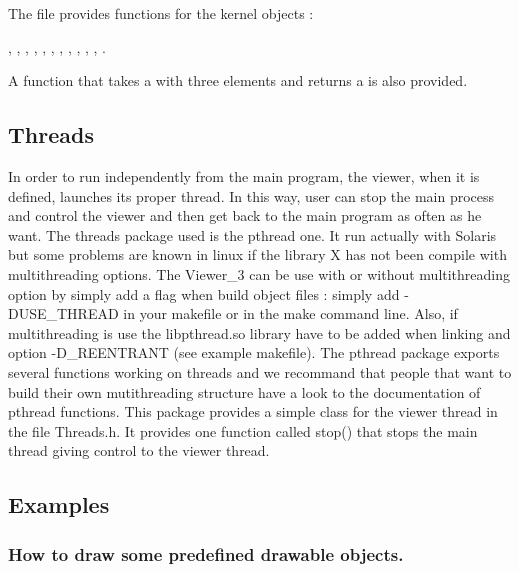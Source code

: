 The file  provides  functions
for the kernel objects : 

,  , ,
, , ,
, , , ,
, .

A function that takes a  with three elements and
returns a  is also provided.

\subsection{Threads}

In order to run independently from the main program, the viewer, when
it is defined, launches its proper thread. In this way, user can stop
the main process and control the viewer and then get back to the main
program as often as he want. 
The threads package used is the pthread one. It run actually with
Solaris but some problems are known in linux if the library X has not 
been compile with multithreading options. The Viewer\_3 can be use with 
or without multithreading option by simply add a flag when build
object files : simply add -DUSE\_THREAD in your makefile or in the make 
command line. Also, if multithreading is use the libpthread.so library
have to be added when linking and option -D\_REENTRANT (see example
makefile).
The pthread package exports several functions working on threads and
we recommand that people that want to build their own mutithreading
structure have a look to the documentation of pthread functions. This
package provides a simple class for the viewer thread in the file
Threads.h. It provides one function called stop() that stops the main
thread giving control to the viewer thread.

\subsection{Examples}

\subsubsection{How to draw some predefined drawable objects.}


